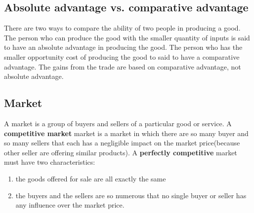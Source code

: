 \documentclass[a4paper,13pt]{report}
\begin{document}
\subsection{Absolute advantage vs. comparative advantage}
There are two ways to compare the ability of two people in producing a good. The person who can produce the good with the smaller quantity of inputs is said to have an absolute advantage in producing the good. The person who has the smaller opportunity cost of producing the good to said to have a comparative advantage. The gains from the trade are based on comparative advantage, not absolute advantage.

\subsection{Market}
A market is a group of buyers and sellers of a particular good or service. A \textbf{competitive market} market is a market in which there are so many buyer and so many sellers that each has a negligible impact on the market price(because other seller are offering similar products). A \textbf{perfectly competitive} market must have two characteristics:
\begin{enumerate}
    \item the goods offered for sale are all exactly the same
    \item the buyers and the sellers are so numerous that no single buyer or seller has any influence over the market price.
\end{enumerate}
\end{document}
